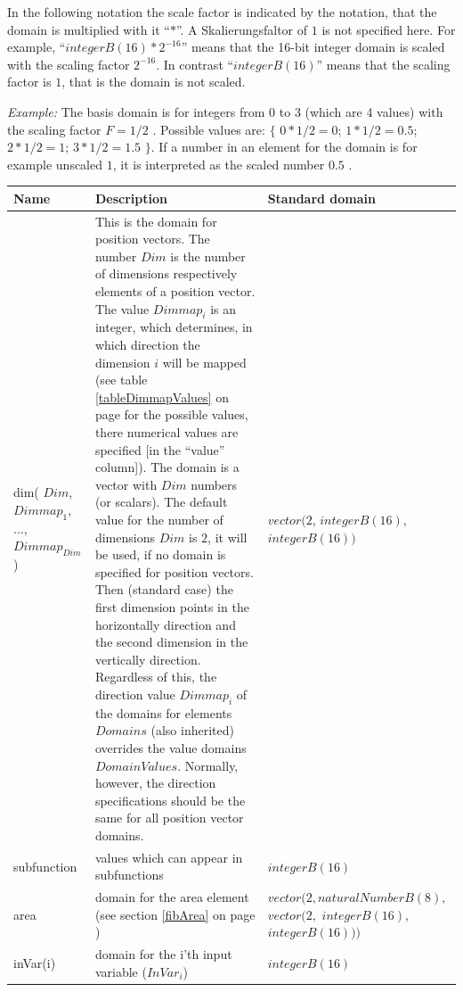 In the following notation the scale factor is indicated by the notation, that the domain is multiplied with it ``$*$''. A Skalierungsfaltor of $1$ is not specified here. For example, ``$integerB(16) * 2^{-16}$'' means that the 16-bit integer domain is scaled with the scaling factor $2^{-16}$. In contrast ``$integerB(16)$'' means that the scaling factor is $1$, that is the domain is not scaled.

\noindent
\textit{Example:} The basis domain is for integers from $0$ to $3$ (which are 4 values) with the scaling factor $F=1/2$ . Possible values are: $\{$ $0*1/2=0$; $1*1/2=0.5$; $2*1/2=1$; $3*1/2=1.5$ $\}$. If a number in an element for the domain is for example unscaled $1$, it is interpreted as the scaled number $0.5$ .

\begin{center}
\label{tableElementsForDomainsBegin}
\begin{longtable}{|p{20mm}|p{55mm}|p{50mm}|}\hline
	Name & Description & Standard domain \\\hline\endhead
	dim( $Dim$, $Dimmap_1$, $\ldots$, $Dimmap_{Dim}$ ) & This is the domain for position vectors. The number $Dim$ is the number of dimensions respectively elements of a position vector. The value $Dimmap_i$ is an integer, which determines, in which direction the dimension $i$ will be mapped (see table \ref{tableDimmapValues} on page \pageref{tableDimmapValues} for the possible values, there numerical values are specified [in the ``value'' column]). The domain is a vector with $Dim$ numbers (or scalars). The default value for the number of dimensions $Dim$ is $2$, it will be used, if no domain is specified for position vectors. Then (standard case) the first dimension points in the horizontally direction and the second dimension in the vertically direction. Regardless of this, the direction value $Dimmap_i$ of the domains for elements $Domains$ (also inherited) overrides the value domains $DomainValues$. Normally, however, the direction specifications should be the same for all position vector domains. & $vector( 2$, $integerB(16)$, $integerB(16) )$  \\\hline
	subfunction & values which can appear in subfunctions & $integerB(16)$ \\\hline
	area & domain for the area element (see section \ref{fibArea} on page \pageref{fibArea}) & $vector( 2, naturalNumberB(8),$ $vector( 2,$ $integerB(16),$ $integerB(16) ) )$ \\\hline
	inVar(i) & domain for the i'th input variable ($InVar_i$) & $integerB(16)$ \\\hline

\end{longtable}
\end{center}
